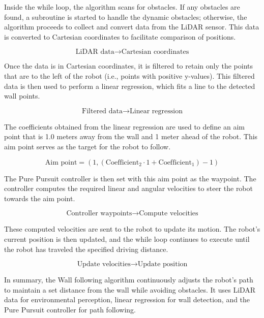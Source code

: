 \documentclass{article}
\begin{document}
	Inside the while loop, the algorithm scans for obstacles. If any obstacles are found, a subroutine is started to handle the dynamic obstacles; otherwise, the algorithm proceeds to collect and convert data from the LiDAR sensor. This data is converted to Cartesian coordinates to facilitate comparison of positions.
	
	\[
	\text{LiDAR data} \rightarrow \text{Cartesian coordinates}
	\]
	
	Once the data is in Cartesian coordinates, it is filtered to retain only the points that are to the left of the robot (i.e., points with positive y-values). This filtered data is then used to perform a linear regression, which fits a line to the detected wall points.
	
	\[
	\text{Filtered data} \rightarrow \text{Linear regression}
	\]
	
	The coefficients obtained from the linear regression are used to define an aim point that is 1.0 meters away from the wall and 1 meter ahead of the robot. This aim point serves as the target for the robot to follow.
	
	\[
	\text{Aim point} = \left(1, \left(\text{Coefficient}_2 \cdot 1 + \text{Coefficient}_1\right) - 1\right)
	\]
	
	The Pure Pursuit controller is then set with this aim point as the waypoint. The controller computes the required linear and angular velocities to steer the robot towards the aim point.
	
	\[
	\text{Controller waypoints} \rightarrow \text{Compute velocities}
	\]
	
	These computed velocities are sent to the robot to update its motion. The robot's current position is then updated, and the while loop continues to execute until the robot has traveled the specified driving distance.
	
	\[
	\text{Update velocities} \rightarrow \text{Update position}
	\]
	
	In summary, the Wall following algorithm continuously adjusts the robot's path to maintain a set distance from the wall while avoiding obstacles. It uses LiDAR data for environmental perception, linear regression for wall detection, and the Pure Pursuit controller for path following.
	
\end{document}
